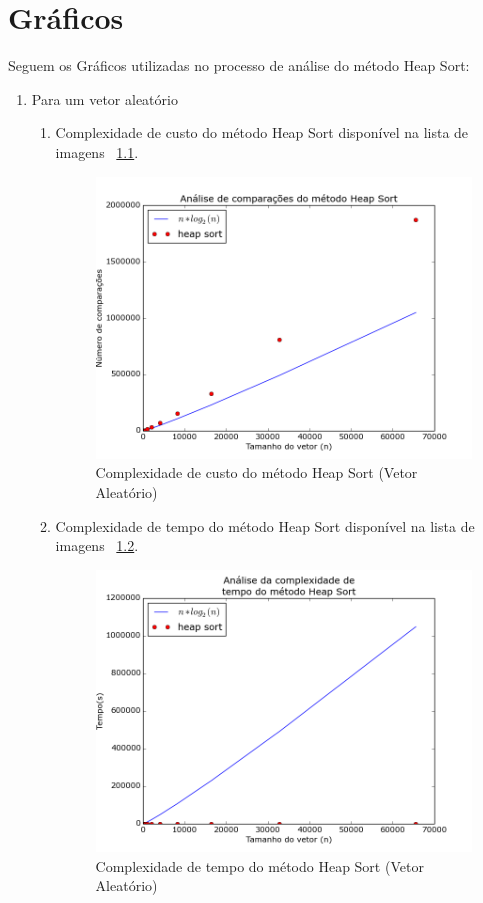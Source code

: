 \documentclass[12pt,a4paper,twoside]{report}
\begin{document}
\chapter{Gráficos}

Seguem os Gráficos utilizadas no processo de análise do método Heap Sort:
\begin{enumerate}

	\item Para um vetor aleatório
	\begin{enumerate}
		\item Complexidade de custo do método Heap Sort disponível na lista de imagens ~\ref{fig:HeapPlot1A}.
		\begin{figure}[!h]
			\centering
			\includegraphics[scale=0.6]{../imagens/Heap/heap_plot_1_aleatorio.png}
			\caption{Complexidade de custo do método Heap Sort (Vetor Aleatório) \label{fig:HeapPlot1A}}
		\end{figure}
		
		
		\item Complexidade de tempo do método Heap Sort disponível na lista de imagens ~\ref{fig:HeapPlot2A}.
		\begin{figure}[!h]
			\centering
			\includegraphics[scale=0.6]{../imagens/Heap/heap_plot_2_aleatorio.png}
			\caption{Complexidade de tempo do método Heap Sort (Vetor Aleatório)\label{fig:HeapPlot2A}}
		\end{figure}
		

\end{enumerate}
\end{enumerate}
\end{document}
